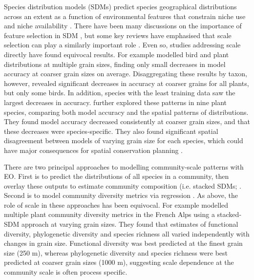 Species distribution models (SDMs) predict species geographical distributions across an extent as a function of environmental features that constrain niche use and niche availability \cite{Soberon2005-nz}. There have been many discussions on the importance of feature selection in SDM \cite{Booth2014-le, Brandt2017-ze, Fourcade2018-ws}, but some key reviews have emphasised that scale selection can play a similarly important role \cite{mayor2009habitat,mcgarigal2016multi}. Even so, studies addressing scale directly have found equivocal results. For example \cite{Guisan2007-zu} modelled bird and plant distributions at multiple grain sizes, finding only small decreases in model accuracy at coarser grain sizes on average. Disaggregating these results by taxon, however, revealed significant decreases in accuracy at coarser grains for all plants, but only some birds. In addition, species with the least training data saw the largest decreases in accuracy. \cite{Seo2009-ms} further explored these patterns in nine plant species, comparing both model accuracy and the spatial patterns of distributions. They found model accuracy decreased consistently at coarser grain sizes, and that these decreases were species‐specific. They also found significant spatial disagreement between models of varying grain size for each species, which could have major consequences for spatial conservation planning \cite{faleiro2013defining}.

There are two principal approaches to modelling community‐scale patterns with EO. First is to predict the distributions of all species in a community, then overlay these outputs to estimate community composition (i.e. stacked SDMs; \cite{Thuiller2009-ou,Calabrese2014-ct}. Second is to model community diversity metrics via regression \cite{Gillespie2008-gi, Saatchi2008-jq}. As above, the role of scale in these approaches has been equivocal. For example \cite{Thuiller2015-mn} modelled multiple plant community diversity metrics in the French Alps using a stacked‐SDM approach at varying grain sizes. They found that estimates of functional diversity, phylogenetic diversity and species richness all varied independently with changes in grain size. Functional diversity was best predicted at the finest grain size (250 m), whereas phylogenetic diversity and species richness were best predicted at coarser grain sizes (1000 m), suggesting scale dependence at the community scale is often process specific.

